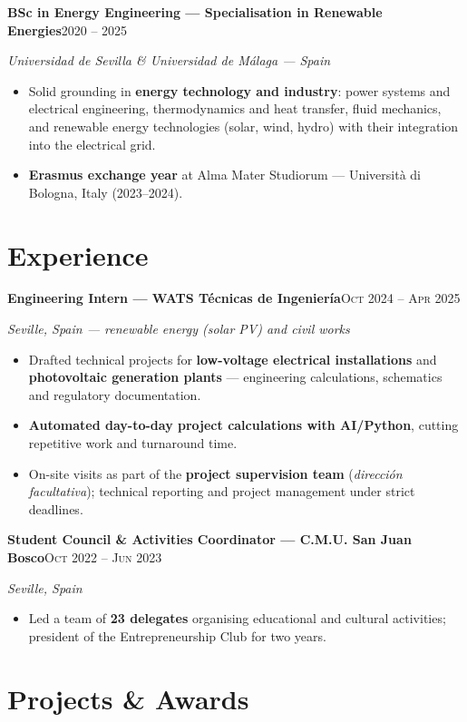 \documentclass[10.5pt,a4paper]{article}
\newcommand{\entry}[2]{%
  {\textbf{#1}\hfill{\small\color{cobalt}\textsc{#2}}}\par}
\newcommand{\where}[1]{{\small\itshape\color{inkfaint}#1}\par\vspace{2pt}}
\newenvironment{bullets}
  {\begin{itemize}[leftmargin=1.15em,itemsep=1.5pt,parsep=0pt,topsep=2.5pt]
   \renewcommand\labelitemi{{\color{cobalt}\footnotesize$\bullet$}}}
  {\end{itemize}}
\begin{document}
\entry{BSc in Energy Engineering --- Specialisation in Renewable Energies}{2020 -- 2025}
\where{Universidad de Sevilla \& Universidad de M\'alaga --- Spain}
\begin{bullets}
  \item Solid grounding in \textbf{energy technology and industry}: power systems and electrical engineering, thermodynamics and heat transfer, fluid mechanics, and renewable energy technologies (solar, wind, hydro) with their integration into the electrical grid.
  \item \textbf{Erasmus exchange year} at Alma Mater Studiorum --- Universit\`a di Bologna, Italy (2023--2024).
\end{bullets}

\section{Experience}

\entry{Engineering Intern --- WATS T\'ecnicas de Ingenier\'ia}{Oct 2024 -- Apr 2025}
\where{Seville, Spain --- renewable energy (solar PV) and civil works}
\begin{bullets}
  \item Drafted technical projects for \textbf{low-voltage electrical installations} and \textbf{photovoltaic generation plants} --- engineering calculations, schematics and regulatory documentation.
  \item \textbf{Automated day-to-day project calculations with AI/Python}, cutting repetitive work and turnaround time.
  \item On-site visits as part of the \textbf{project supervision team} (\textit{direcci\'on facultativa}); technical reporting and project management under strict deadlines.
\end{bullets}
\vspace{5pt}

\entry{Student Council \& Activities Coordinator --- C.M.U. San Juan Bosco}{Oct 2022 -- Jun 2023}
\where{Seville, Spain}
\begin{bullets}
  \item Led a team of \textbf{23 delegates} organising educational and cultural activities; president of the Entrepreneurship Club for two years.
\end{bullets}

\section{Projects \& Awards}
\end{document}
